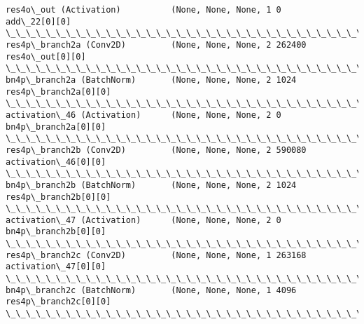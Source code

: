 \documentclass[11pt]{article}
\begin{document}
\begin{Verbatim}[commandchars=\\\{\}]
res4o\_out (Activation)          (None, None, None, 1 0           add\_22[0][0]                     
\_\_\_\_\_\_\_\_\_\_\_\_\_\_\_\_\_\_\_\_\_\_\_\_\_\_\_\_\_\_\_\_\_\_\_\_\_\_\_\_\_\_\_\_\_\_\_\_\_\_\_\_\_\_\_\_\_\_\_\_\_\_\_\_\_\_\_\_\_\_\_\_\_\_\_\_\_\_\_\_\_\_\_\_\_\_\_\_\_\_\_\_\_\_\_\_\_\_
res4p\_branch2a (Conv2D)         (None, None, None, 2 262400      res4o\_out[0][0]                  
\_\_\_\_\_\_\_\_\_\_\_\_\_\_\_\_\_\_\_\_\_\_\_\_\_\_\_\_\_\_\_\_\_\_\_\_\_\_\_\_\_\_\_\_\_\_\_\_\_\_\_\_\_\_\_\_\_\_\_\_\_\_\_\_\_\_\_\_\_\_\_\_\_\_\_\_\_\_\_\_\_\_\_\_\_\_\_\_\_\_\_\_\_\_\_\_\_\_
bn4p\_branch2a (BatchNorm)       (None, None, None, 2 1024        res4p\_branch2a[0][0]             
\_\_\_\_\_\_\_\_\_\_\_\_\_\_\_\_\_\_\_\_\_\_\_\_\_\_\_\_\_\_\_\_\_\_\_\_\_\_\_\_\_\_\_\_\_\_\_\_\_\_\_\_\_\_\_\_\_\_\_\_\_\_\_\_\_\_\_\_\_\_\_\_\_\_\_\_\_\_\_\_\_\_\_\_\_\_\_\_\_\_\_\_\_\_\_\_\_\_
activation\_46 (Activation)      (None, None, None, 2 0           bn4p\_branch2a[0][0]              
\_\_\_\_\_\_\_\_\_\_\_\_\_\_\_\_\_\_\_\_\_\_\_\_\_\_\_\_\_\_\_\_\_\_\_\_\_\_\_\_\_\_\_\_\_\_\_\_\_\_\_\_\_\_\_\_\_\_\_\_\_\_\_\_\_\_\_\_\_\_\_\_\_\_\_\_\_\_\_\_\_\_\_\_\_\_\_\_\_\_\_\_\_\_\_\_\_\_
res4p\_branch2b (Conv2D)         (None, None, None, 2 590080      activation\_46[0][0]              
\_\_\_\_\_\_\_\_\_\_\_\_\_\_\_\_\_\_\_\_\_\_\_\_\_\_\_\_\_\_\_\_\_\_\_\_\_\_\_\_\_\_\_\_\_\_\_\_\_\_\_\_\_\_\_\_\_\_\_\_\_\_\_\_\_\_\_\_\_\_\_\_\_\_\_\_\_\_\_\_\_\_\_\_\_\_\_\_\_\_\_\_\_\_\_\_\_\_
bn4p\_branch2b (BatchNorm)       (None, None, None, 2 1024        res4p\_branch2b[0][0]             
\_\_\_\_\_\_\_\_\_\_\_\_\_\_\_\_\_\_\_\_\_\_\_\_\_\_\_\_\_\_\_\_\_\_\_\_\_\_\_\_\_\_\_\_\_\_\_\_\_\_\_\_\_\_\_\_\_\_\_\_\_\_\_\_\_\_\_\_\_\_\_\_\_\_\_\_\_\_\_\_\_\_\_\_\_\_\_\_\_\_\_\_\_\_\_\_\_\_
activation\_47 (Activation)      (None, None, None, 2 0           bn4p\_branch2b[0][0]              
\_\_\_\_\_\_\_\_\_\_\_\_\_\_\_\_\_\_\_\_\_\_\_\_\_\_\_\_\_\_\_\_\_\_\_\_\_\_\_\_\_\_\_\_\_\_\_\_\_\_\_\_\_\_\_\_\_\_\_\_\_\_\_\_\_\_\_\_\_\_\_\_\_\_\_\_\_\_\_\_\_\_\_\_\_\_\_\_\_\_\_\_\_\_\_\_\_\_
res4p\_branch2c (Conv2D)         (None, None, None, 1 263168      activation\_47[0][0]              
\_\_\_\_\_\_\_\_\_\_\_\_\_\_\_\_\_\_\_\_\_\_\_\_\_\_\_\_\_\_\_\_\_\_\_\_\_\_\_\_\_\_\_\_\_\_\_\_\_\_\_\_\_\_\_\_\_\_\_\_\_\_\_\_\_\_\_\_\_\_\_\_\_\_\_\_\_\_\_\_\_\_\_\_\_\_\_\_\_\_\_\_\_\_\_\_\_\_
bn4p\_branch2c (BatchNorm)       (None, None, None, 1 4096        res4p\_branch2c[0][0]             
\_\_\_\_\_\_\_\_\_\_\_\_\_\_\_\_\_\_\_\_\_\_\_\_\_\_\_\_\_\_\_\_\_\_\_\_\_\_\_\_\_\_\_\_\_\_\_\_\_\_\_\_\_\_\_\_\_\_\_\_\_\_\_\_\_\_\_\_\_\_\_\_\_\_\_\_\_\_\_\_\_\_\_\_\_\_\_\_\_\_\_\_\_\_\_\_\_\_

\end{Verbatim}
\end{document}
